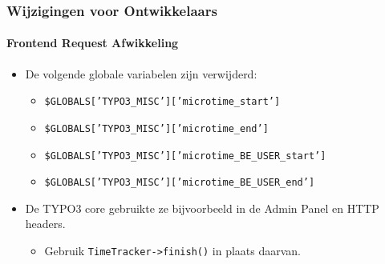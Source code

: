\begin{frame}[fragile]
	\frametitle{Wijzigingen voor Ontwikkelaars}
	\framesubtitle{Frontend Request Afwikkeling}

	\lstset{basicstyle=\smaller\ttfamily}

	\begin{itemize}
		\item De volgende globale variabelen zijn verwijderd:

			\begin{itemize}
				\item \texttt{\$GLOBALS['TYPO3\_MISC']['microtime\_start']}
				\item \texttt{\$GLOBALS['TYPO3\_MISC']['microtime\_end']}
				\item \texttt{\$GLOBALS['TYPO3\_MISC']['microtime\_BE\_USER\_start']}
				\item \texttt{\$GLOBALS['TYPO3\_MISC']['microtime\_BE\_USER\_end']}
			\end{itemize}

		\item De TYPO3 core gebruikte ze bijvoorbeeld in de Admin Panel en HTTP headers.

			\begin{itemize}\smaller
				\item[\ding{228}] Gebruik \texttt{TimeTracker->finish()} in plaats daarvan.
			\end{itemize}\normalsize

	\end{itemize}

\end{frame}



